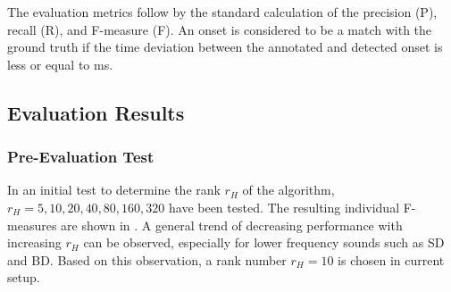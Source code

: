 \documentclass{article}
\begin{document}
The evaluation metrics follow by the standard calculation of the precision (P), recall (R), and F-measure (F). %
An onset is considered to be a match with the ground truth if the time deviation between the annotated and detected onset is less or equal to \unit[50]{ms}.  
%
%
  



\subsection{Evaluation Results}\label{subsec:evaluation results}

\subsubsection{Pre-Evaluation Test}
In an initial test to determine the rank $r_H$ of the algorithm, $r_H = {5, 10, 20, 40, 80, 160, 320}$ have been tested. The resulting individual F-measures are shown in . A general trend of decreasing performance with increasing $r_H$ can be observed, especially for lower frequency sounds such as SD and BD. Based on this observation, a rank number $r_H = 10$ is chosen in current setup. %
\end{document}
